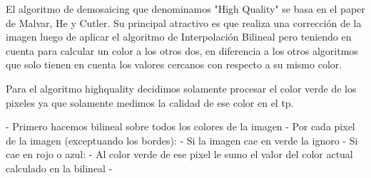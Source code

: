 El algoritmo de demosaicing que denominamos "High Quality" se basa en el paper de Malvar, He y Cutler. Su principal atractivo es que realiza una corrección de la imagen luego de aplicar el algoritmo de Interpolación Bilineal pero teniendo en cuenta para calcular un color a los otros dos, en diferencia a los otros algoritmos que solo tienen en cuenta los valores cercanos con respecto a su mismo color.



Para el algoritmo highquality decidimos solamente procesar el color verde de los pixeles ya que solamente medimos la calidad de ese color en el tp.

- Primero hacemos bilineal sobre todos los colores de la imagen
- Por cada pixel de la imagen (exceptuando los bordes):
	- Si la imagen cae en verde la ignoro
	- Si cae en rojo o azul:
		- Al color verde de ese pixel le sumo el valor del color actual calculado en la bilineal
		- 
		
	


